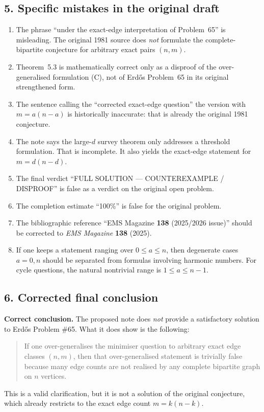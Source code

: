 \subsection*{5. Specific mistakes in the original draft}

\begin{enumerate}
\item The phrase ``under the exact-edge interpretation of Problem~65'' is misleading. The original 1981 source does \emph{not} formulate the complete-bipartite conjecture for arbitrary exact pairs $(n,m)$.

\item Theorem~5.3 is mathematically correct only as a disproof of the over-generalised formulation (C), not of Erd\H{o}s Problem~65 in its original strengthened form.

\item The sentence calling the ``corrected exact-edge question'' the version with $m=a(n-a)$ is historically inaccurate: that is already the original 1981 conjecture.

\item The note says the large-$d$ survey theorem only addresses a threshold formulation. That is incomplete. It also yields the exact-edge statement for $m=d(n-d)$.

\item The final verdict ``FULL SOLUTION --- COUNTEREXAMPLE / DISPROOF'' is false as a verdict on the original open problem.

\item The completion estimate ``100\%'' is false for the original problem.

\item The bibliographic reference ``EMS Magazine \textbf{138} (2025/2026 issue)'' should be corrected to \emph{EMS Magazine} \textbf{138} (2025).

\item If one keeps a statement ranging over $0\le a\le n$, then degenerate cases $a=0,n$ should be separated from formulas involving harmonic numbers. For cycle questions, the natural nontrivial range is $1\le a\le n-1$.
\end{enumerate}

\subsection*{6. Corrected final conclusion}

\textbf{Correct conclusion.}
The proposed note does \emph{not} provide a satisfactory solution to Erd\H{o}s Problem \#65. What it does show is the following:
\begin{quote}
If one over-generalises the minimiser question to arbitrary exact edge classes $(n,m)$, then that over-generalised statement is trivially false because many edge counts are not realised by any complete bipartite graph on $n$ vertices.
\end{quote}
This is a valid clarification, but it is not a solution of the original conjecture, which already restricts to the exact edge count $m=k(n-k)$.

